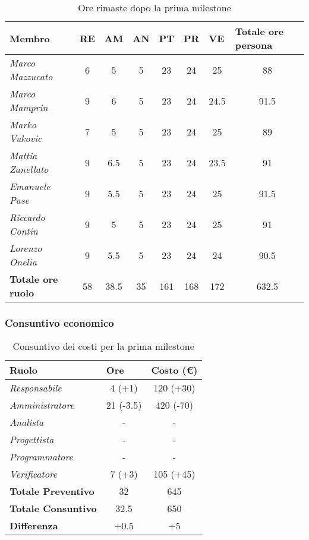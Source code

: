 \begin{table}[!ht]
    \centering
    \begin{tabular}{|l|c|c|c|c|c|c|c|}
    \hline
    \textbf{Membro} & \multicolumn{1}{l|}{\textbf{RE}} & \multicolumn{1}{l|}{\textbf{AM}} & \multicolumn{1}{l|}{\textbf{AN}} & \multicolumn{1}{l|}{\textbf{PT}} & \multicolumn{1}{l|}{\textbf{PR}} & \multicolumn{1}{l|}{\textbf{VE}} & \multicolumn{1}{l|}{\textbf{Totale ore persona}} \\ \hline
    \textit{Marco Mazzucato}  & 6  & 5   & 5  & 23  & 24 & 25   & 88   \\ \hline
    \textit{Marco Mamprin}    & 9  & 6   & 5  & 23  & 24 & 24.5 & 91.5 \\ \hline
    \textit{Marko Vukovic}    & 7  & 5   & 5  & 23  & 24 & 25   & 89   \\ \hline
    \textit{Mattia Zanellato} & 9  & 6.5 & 5  & 23  & 24 & 23.5 & 91   \\ \hline
    \textit{Emanuele Pase}    & 9  & 5.5 & 5  & 23  & 24 & 25   & 91.5 \\ \hline
    \textit{Riccardo Contin}  & 9  & 5   & 5  & 23  & 24 & 25   & 91   \\ \hline
    \textit{Lorenzo Onelia}   & 9  & 5.5 & 5  & 23  & 24 & 24   & 90.5 \\ \hline
    \textbf{Totale ore ruolo} & 58 & 38.5& 35 & 161 & 168& 172  & 632.5\\ \hline
    \end{tabular}
    \caption{Ore rimaste dopo la prima milestone}
\end{table}

\subsubsection{Consuntivo economico}

\begin{table}[!ht]
    \centering
    \begin{tabular}{|l|c|c|}
    \hline
    \textbf{Ruolo} & \multicolumn{1}{l|}{\textbf{Ore}} & \multicolumn{1}{l|}{\textbf{Costo (€)}} \\ \hline
    \textit{Responsabile}      & 4 (+1)    & 120 (+30) \\ \hline
    \textit{Amministratore}    & 21 (-3.5) & 420 (-70) \\ \hline
    \textit{Analista}          & -         & -         \\ \hline
    \textit{Progettista}       & -         & -         \\ \hline
    \textit{Programmatore}     & -         & -         \\ \hline
    \textit{Verificatore}      & 7 (+3)    & 105 (+45) \\ \hline
    \textbf{Totale Preventivo} & 32        & 645       \\ \hline
    \textbf{Totale Consuntivo} & 32.5      & 650       \\ \hline
    \textbf{Differenza}        & +0.5      & +5       \\ \hline
    \end{tabular}
    \caption{Consuntivo dei costi per la prima milestone}
\end{table}

